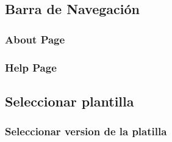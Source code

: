 \documentclass[12pt, a4paper, twoside]{article}
\begin{document}
\begin{umaappendices}
	\subsection{Barra de Navegación}
	\subsubsection{About Page}
	\subsubsection{Help Page}
	\subsection{Seleccionar plantilla}
	\subsubsection{Seleccionar version de la platilla}


\end{umaappendices}



\end{document}

